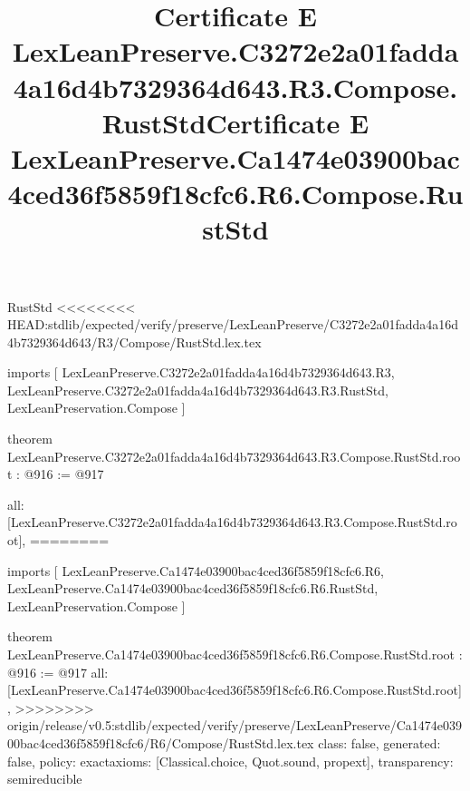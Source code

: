 \begin{lexlean}{RustStd}
<<<<<<<< HEAD:stdlib/expected/verify/preserve/LexLeanPreserve/C3272e2a01fadda4a16d4b7329364d643/R3/Compose/RustStd.lex.tex
\title{Certificate E LexLeanPreserve.C3272e2a01fadda4a16d4b7329364d643.R3.Compose.RustStd}
\begin{coremodule}
imports [
  LexLeanPreserve.C3272e2a01fadda4a16d4b7329364d643.R3,
  LexLeanPreserve.C3272e2a01fadda4a16d4b7329364d643.R3.RustStd,
  LexLeanPreservation.Compose
]

theorem LexLeanPreserve.C3272e2a01fadda4a16d4b7329364d643.R3.Compose.RustStd.root : @916 := @917 {
  all: [LexLeanPreserve.C3272e2a01fadda4a16d4b7329364d643.R3.Compose.RustStd.root],
========
\title{Certificate E LexLeanPreserve.Ca1474e03900bac4ced36f5859f18cfc6.R6.Compose.RustStd}
\begin{coremodule}
imports [
  LexLeanPreserve.Ca1474e03900bac4ced36f5859f18cfc6.R6,
  LexLeanPreserve.Ca1474e03900bac4ced36f5859f18cfc6.R6.RustStd,
  LexLeanPreservation.Compose
]

theorem LexLeanPreserve.Ca1474e03900bac4ced36f5859f18cfc6.R6.Compose.RustStd.root : @916 := @917 {
  all: [LexLeanPreserve.Ca1474e03900bac4ced36f5859f18cfc6.R6.Compose.RustStd.root],
>>>>>>>> origin/release/v0.5:stdlib/expected/verify/preserve/LexLeanPreserve/Ca1474e03900bac4ced36f5859f18cfc6/R6/Compose/RustStd.lex.tex
  class: false,
  generated: false,
  policy: exact{axioms: [Classical.choice, Quot.sound, propext]},
  transparency: semireducible
}


\end{coremodule}}
\end{coremodule}
\end{lexlean}
